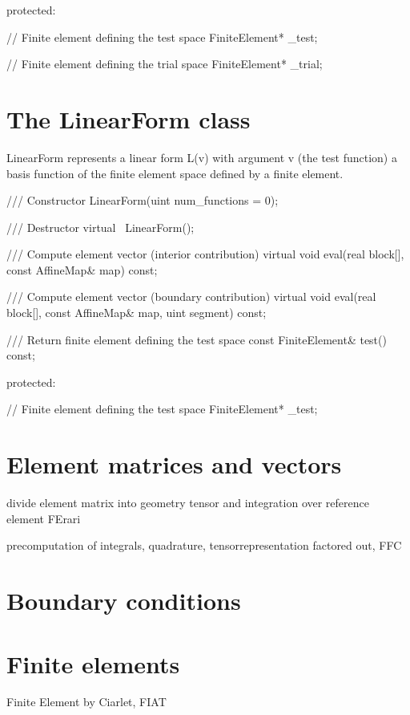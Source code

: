   protected:

    // Finite element defining the test space
    FiniteElement* _test;

    // Finite element defining the trial space
    FiniteElement* _trial;
  

\section{The LinearForm class}

LinearForm represents a linear form L(v) with argument v (the
test function) a basis function of the finite element space
defined by a finite element.

    /// Constructor
    LinearForm(uint num_functions = 0);
    
    /// Destructor
    virtual ~LinearForm();

    /// Compute element vector (interior contribution)
    virtual void eval(real block[], const AffineMap& map) const;

    /// Compute element vector (boundary contribution)
    virtual void eval(real block[], const AffineMap& map, uint segment) const;

    /// Return finite element defining the test space
    const FiniteElement& test() const;

  protected:

    // Finite element defining the test space
    FiniteElement* _test;

\section{Element matrices and vectors} 

divide element matrix into geometry tensor and integration 
over reference element FErari

precomputation of integrals, quadrature, tensorrepresentation factored out, FFC 





\section{Boundary conditions}

\section{Finite elements}

Finite Element by Ciarlet, FIAT 

